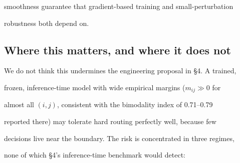 smoothness guarantee that gradient-based training and small-perturbation





robustness both depend on.











\subsection{Where this matters, and where it does not}











We do not think this undermines the engineering proposal in \S4. A trained,





frozen, inference-time model with wide empirical margins ($m_{ij} \gg 0$ for





almost all $(i,j)$, consistent with the bimodality index of 0.71--0.79





reported there) may tolerate hard routing perfectly well, because few





decisions live near the boundary. The risk is concentrated in three regimes,





none of which \S4's inference-time benchmark would detect:











